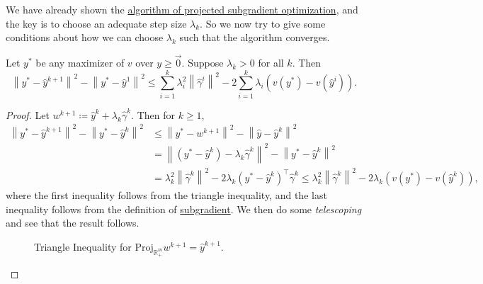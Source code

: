 \begin{prev}
	We have already shown the \hyperref[algo:projected-subgradient-optimization-algorithm]{algorithm of projected subgradient optimization}, and the key is to choose an adequate step size \(\lambda_{k}\). So we now try to give some conditions about how we can choose \(\lambda_{k}\) such that the algorithm converges.
\end{prev}

\begin{lemma}\label{lma:lec20-1}
	Let \(y^{\ast}\) be any maximizer of \(v\) over \(y\geq \vec{0}\). Suppose \(\lambda_{k}>0\) for all \(k\). Then
	\[
		\left\lVert y^{\ast} - \hat{y}^{k+1}\right\rVert^2 - \left\lVert y^{\ast} - \hat{y}^1\right\rVert^2
		\leq \sum\limits_{i=1}^{k} \lambda_{i}^{2}\left\lVert \hat{\gamma}^i\right\rVert^2 - 2 \sum\limits_{i=1}^{k} \lambda_{i}\left(v(y^{\ast}) - v(\hat{y}^i)\right).
	\]
\end{lemma}
\begin{proof}
	Let \(w^{k+1} \coloneqq \hat{y}^k + \lambda_{k}\hat{\gamma}^k\). Then for \(k\geq 1\),
	\[
		\begin{split}
			\left\lVert y^{\ast} - \hat{y}^{k+1}\right\rVert^2 - \left\lVert y^{\ast} - \hat{y}^k\right\rVert^2
			&\leq \left\lVert y^{\ast} - w^{k+1}\right\rVert^2 - \left\lVert \hat{y} - \hat{y}^k\right\rVert^2\\
			&= \left\lVert (y^{\ast} - \hat{y}^k) - \lambda_{k}\hat{\gamma}^k\right\rVert^2 - \left\lVert y^{\ast} - \hat{y}^k\right\rVert^2\\
			&= \lambda_{k}^{2}\left\lVert \hat{\gamma}^k\right\rVert^2 - 2\lambda_{k}(y^{\ast} - \hat{y}^k)^{\top}\hat{\gamma}^k
			\leq \lambda_{k}^{2}\left\lVert \hat{\gamma}^k\right\rVert^2 - 2\lambda_{k}(v(y^{\ast}) - v(\hat{y}^k)),
		\end{split}
	\]
	where the first inequality follows from the triangle inequality, and the last inequality follows from the definition of \hyperref[def:subgradient]{subgradient}. We then do some \emph{telescoping} and see that the result follows.
	\begin{figure}[H]
		\centering
		\caption{Triangle Inequality for \(\mathrm{Proj}_{\mathbb{R}^m_+}w^{k+1} = \hat{y}^{k+1}\).}
		\label{fig:maximizer-lemma-triangle-inequality}
	\end{figure}
\end{proof}

